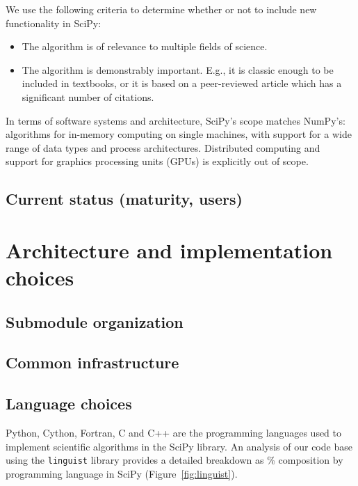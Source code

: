 \documentclass[fleqn,10pt]{wlscirep}
\begin{document}
We use the following criteria to determine whether or not to include new
functionality in SciPy:
\begin{itemize}
    \item The algorithm is of relevance to multiple fields of science.
    \item The algorithm is demonstrably important.  E.g., it is classic
    enough to be included in textbooks, or it is based on a peer-reviewed article
    which has a significant number of citations.
\end{itemize}

In terms of software systems and architecture, SciPy's scope matches NumPy's:
algorithms for in-memory computing on single machines, with support for a wide
range of data types and process architectures. Distributed computing and support
for graphics processing units (GPUs) is explicitly out of scope.

\subsection*{Current status (maturity, users)}


\section*{Architecture and implementation choices}

\subsection*{Submodule organization}



\subsection*{Common infrastructure}

\subsection*{Language choices}

Python, Cython, Fortran, C and C++ are the programming languages used to
implement scientific algorithms in the SciPy library. An analysis of our code
base using the \texttt{linguist} library provides a detailed breakdown as \%
composition by programming language in SciPy (Figure~\ref{fig:linguist}).
\end{document}
